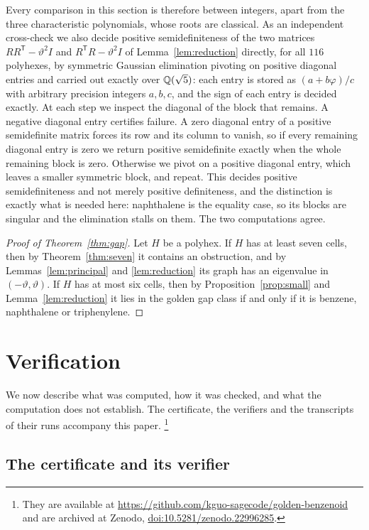 \documentclass[11pt]{article}
\newcommand\vphi{\varphi}
\newcommand\thetaG{\vartheta}
\newcommand\tp{^{\mathsf T}}
\theoremstyle{definition}
\begin{document}
Every comparison in this section is therefore between integers, apart from
the three characteristic polynomials, whose roots are classical.  As an
independent cross-check we also decide positive semidefiniteness of the two
matrices $RR\tp-\thetaG^2I$ and $R\tp R-\thetaG^2I$ of
Lemma~\ref{lem:reduction} directly, for all $116$ polyhexes, by symmetric
Gaussian elimination pivoting on positive diagonal entries and carried out
exactly over ${\mathbb Q}(\sqrt5)$: each entry is stored as $(a+b\vphi)/c$ with
arbitrary precision integers $a,b,c$, and the sign of each entry is decided
exactly.  At each step we inspect the diagonal of the block that remains.  A
negative diagonal entry certifies failure.  A zero diagonal entry of a
positive semidefinite matrix forces its row and its column to vanish, so if
every remaining diagonal entry is zero we return positive semidefinite
exactly when the whole remaining block is zero.  Otherwise we pivot on a
positive diagonal entry, which leaves a smaller symmetric block, and repeat.
This decides positive semidefiniteness and not merely positive definiteness,
and the distinction is exactly what is needed here: naphthalene is the
equality case, so its blocks are singular and the elimination stalls on them.
The two computations agree.

\begin{proof}[Proof of Theorem~\ref{thm:gap}]
Let $H$ be a polyhex.  If $H$ has at least seven cells, then by
Theorem~\ref{thm:seven} it contains an obstruction, and by
Lemmas~\ref{lem:principal} and \ref{lem:reduction} its graph has an
eigenvalue in $(-\thetaG,\thetaG)$.  If $H$ has at most six cells, then by
Proposition~\ref{prop:small} and Lemma~\ref{lem:reduction} it lies in the
golden gap class if and only if it is benzene, naphthalene or triphenylene.
\end{proof}

\section{Verification}\label{sec:verification}

We now describe what was computed, how it was checked, and what the
computation does not establish.  The certificate, the verifiers and the
transcripts of their runs accompany this paper.%
\footnote{They are available at
\url{https://github.com/kguo-sagecode/golden-benzenoid} and are archived at
Zenodo, \href{https://doi.org/10.5281/zenodo.22996285}{doi:10.5281/zenodo.22996285}.}

\subsection*{The certificate and its verifier}
\end{document}
